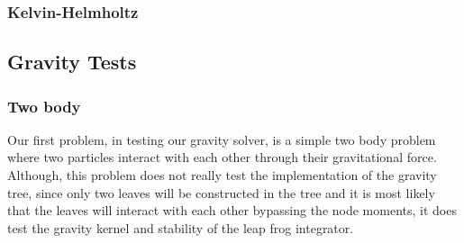 \subsubsection{Kelvin-Helmholtz}

\subsection{Gravity Tests}
\subsubsection{Two body}
Our first problem, in testing our gravity solver, is a simple two body problem where two particles
interact with each other through their gravitational force. Although, this problem does not really test the 
implementation of the gravity tree, since only two leaves will be constructed
in the tree and it is most likely that the leaves will interact with each other bypassing the node 
moments, it does test the gravity kernel and stability of the leap frog integrator.

